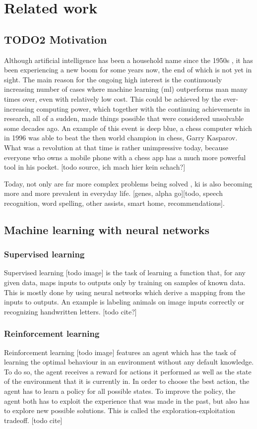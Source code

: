 \chapter{Related work}

\section{TODO2 Motivation} 
Although artificial intelligence has been a household name since the 1950s \cite{Rosenblatt58theperceptron:}, it has been experiencing a new boom for some years now, the end of which is not yet in sight.
The main reason for the ongoing high interest is the continuously increasing number of cases where machine learning (ml) outperforms man many times over, even with relatively low cost.
This could be achieved by the ever-increasing computing power, which together with the continuing achievements in research, all of a sudden, made things possible that were considered unsolvable some decades ago.
An example of this event is deep blue, a chess computer which in 1996 was able to beat the then world champion in chess, Garry Kasparov. What was a revolution at that time is rather unimpressive today, because everyone who owns a mobile phone with a chess app has a much more powerful tool in his pocket. [todo source, ich mach hier kein schach?]

Today, not only are far more complex problems being solved , ki is also becoming more and more prevalent in everyday life. [genes, alpha go][todo, speech recognition, word spelling, other assists, smart home, recommendations].

\section{Machine learning with neural networks}


\subsection{Supervised learning}

Supervised learning [todo image] is the task of learning a function that, for any given data, maps inputs to outputs only by training on samples of known data. This is mostly done by using neural networks which derive a mapping from the inputs to outputs. An example is labeling animals on image inputs correctly or recognizing handwritten letters.  [todo cite?]  

\subsection{Reinforcement learning}
Reinforcement learning [todo image] features an agent which has the task of learning the optimal behaviour in an environment without any default knowledge. To do so, the agent receives a reward for actions it performed as well as the state of the environment that it is currently in. In order to choose the best action, the agent has to learn a policy for all possible states. To improve the policy, the agent both has to exploit the experience that was made in the past, but also has to explore new possible solutions. This is called the exploration-exploitation tradeoff. [todo cite]

